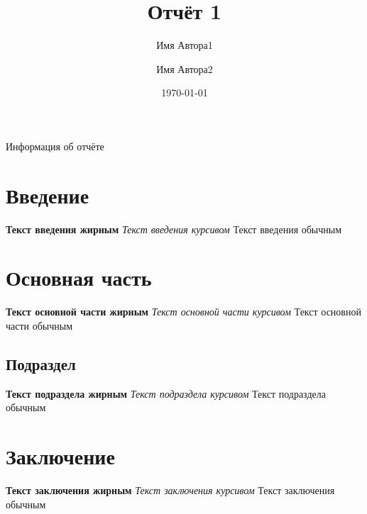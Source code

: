 \documentclass[14pt]{article}
\title{Отчёт 1}
\author{Имя Автора1 \and Имя Автора2}
\date{\today}
\begin{document}
\maketitle

\begin{center}
    {\huge Информация об отчёте}
\end{center}
\hfill \break
\renewcommand{\contentsname}{Содержание}
\tableofcontents
\thispagestyle{empty}
\newpage
\section{Введение}
\tiny{\textbf{Текст введения жирным} \textit{Текст введения курсивом} Текст введения обычным}
\section{Основная часть}
\large{\textbf{Текст основной части жирным} \textit{Текст основной части курсивом} Текст основной части обычным}
\subsection{Подраздел}
\large{\textbf{Текст подраздела жирным} \textit{Текст подраздела курсивом} Текст подраздела обычным}
\section{Заключение}
\huge{\textbf{Текст заключения жирным} \textit{Текст заключения курсивом} Текст заключения обычным}
\end{document}
